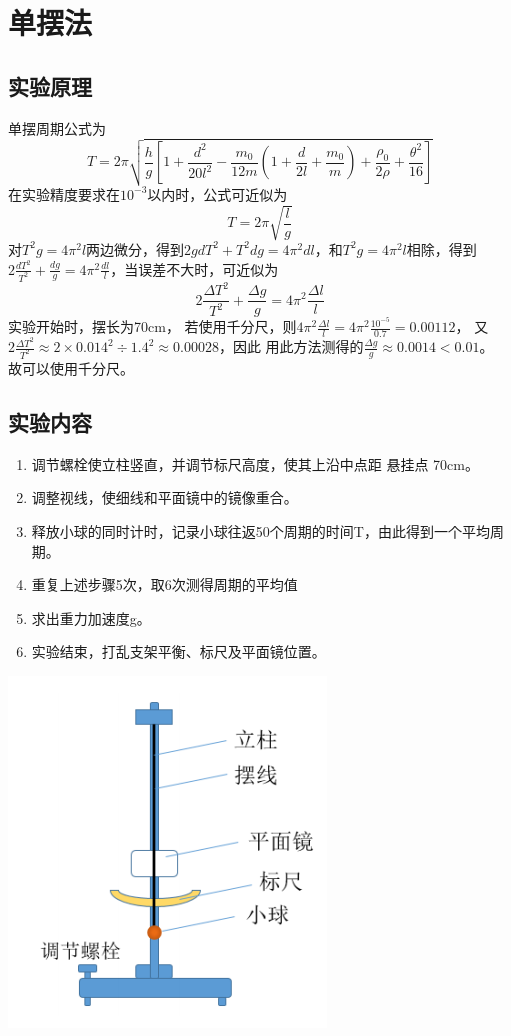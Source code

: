\documentclass[UTF8]{ctexart}
\begin{document}
\section{单摆法}
\subsection*{实验原理}
单摆周期公式为
\[T=2\pi\sqrt{\frac{h}{g}\left[ 1+\frac{d^2}{20l^2}-\frac{m_0}{12m}\left( 1+\frac{d}{2l}+\frac{m_0}{m} \right)+\frac{\rho_0}{2\rho}+\frac{\theta^2}{16} \right]}\]
在实验精度要求在$10^{-3}$以内时，公式可近似为
\[T=2\pi\sqrt{\frac{l}{g}}\]
对$T^2g=4\pi^2l$两边微分，得到$2gdT^2+T^2dg=4\pi^2dl$，和$T^2g=4\pi^2l$相除，得到
$2\frac{dT^2}{T^2}+\frac{dg}{g}=4\pi^2\frac{dl}{l}$，当误差不大时，可近似为
\[2\frac{\Delta T^2}{T^2}+\frac{\Delta g}{g}=4\pi^2\frac{\Delta l}{l}\]
实验开始时，摆长为70cm，
若使用千分尺，则$4\pi^2\frac{\Delta l}{l}=4\pi^2\frac{10^{-5}}{0.7}=0.00112$，
又$2\frac{\Delta T^2}{T^2}\approx 2\times 0.014^2\div 1.4^2\approx 0.00028$，因此
用此方法测得的$\frac{\Delta g}{g}\approx 0.0014<0.01$。
故可以使用千分尺。
\subsection*{实验内容}
\begin{enumerate}
    \item 调节螺栓使立柱竖直，并调节标尺高度，使其上沿中点距
    悬挂点 70cm。
    \item 调整视线，使细线和平面镜中的镜像重合。
    \item 释放小球的同时计时，记录小球往返50个周期的时间T，由此得到一个平均周期。
    \item 重复上述步骤5次，取6次测得周期的平均值
    \item 求出重力加速度g。
    \item 实验结束，打乱支架平衡、标尺及平面镜位置。
\end{enumerate}
\includegraphics[scale=0.5]{fig2.PNG}
\end{document}
